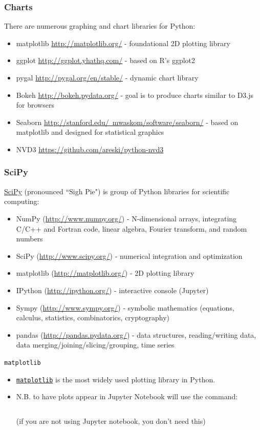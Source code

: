 \documentclass[xcolor=svgnames]{beamer}
\newcommand{\nl}{\\[1em]}
\newcommand{\ft}[1]{\frametitle{#1}}
\begin{document}
\begin{frame}[fragile]\ft{Charts}
There are numerous graphing and chart libraries for Python:
\begin{itemize}
\item matplotlib \href{http://matplotlib.org/}{http://matplotlib.org/} - foundational 2D plotting library
\item ggplot \href{http://ggplot.yhathq.com/}{http://ggplot.yhathq.com/} - based on R's ggplot2
\item pygal \href{http://pygal.org/en/stable/}{http://pygal.org/en/stable/} - dynamic chart library
\item Bokeh \href{http://bokeh.pydata.org/}{http://bokeh.pydata.org/} -  goal is to produce charts similar to D3.js for browsers
\item Seaborn \href{http://stanford.edu/~mwaskom/software/seaborn/}{http://stanford.edu/~mwaskom/software/seaborn/} - based on matplotlib and designed for statistical graphics
\item NVD3 \href{https://github.com/areski/python-nvd3}{https://github.com/areski/python-nvd3}
\end{itemize}
\end{frame}

\begin{frame}\ft{SciPy}
\href{https://www.scipy.org/}{SciPy} (pronounced ``Sigh Pie") is group of Python libraries for scientific computing: 
\begin{itemize}
\item NumPy (\url{http://www.numpy.org/}) - N-dimensional arrays, integrating C/C++ and Fortran code, linear algebra,  Fourier transform, and random numbers
\item SciPy (\url{http://www.scipy.org/}) - numerical integration and optimization
\item matplotlib (\url{http://matplotlib.org/}) - 2D plotting library
\item IPython (\url{http://ipython.org/}) - interactive console (Jupyter)
\item Sympy (\url{http://www.sympy.org/}) - symbolic mathematics (equations, calculus, statistics, combinatorics, cryptography)
\item pandas (\url{http://pandas.pydata.org/}) - data structures, reading/writing data, data merging/joining/slicing/grouping, time series

\end{itemize}
\end{frame}

%
\begin{frame}[fragile]{\tt matplotlib}
\begin{itemize}
\item \href{https://matplotlib.org/}{\tt matplotlib} is the most widely used plotting library in Python.\nl

\item N.B.  to have plots appear in Jupyter Notebook will use the command: 
\begin{Verbatim}[frame=single]
%matplotlib inline
\end{Verbatim}
 (if you are not using Jupyter notebook, you don't need this)\nl
\end{itemize}
\end{frame}
\end{document}

